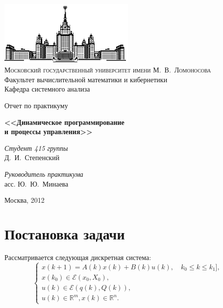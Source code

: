 \documentclass[10pt, a4paper]{article}
\renewcommand{\ell}{\mathcal{E}}
\begin{document}
\thispagestyle{empty}

\begin{center}
\ \vspace{-3cm}

\includegraphics[width=0.5\textwidth]{msu.eps}\\
{\scshape Московский государственный университет имени М.~В.~Ломоносова}\\
Факультет вычислительной математики и кибернетики\\
Кафедра системного анализа

\vfill
{\LARGE Отчет по практикуму}

\vspace{1cm}

{\Huge\bfseries <<Динамическое программирование \\ и процессы управления>>}
\end{center}

\vspace{2cm}

\begin{flushright}
  \large
  \textit{Студент 415 группы}\\
  Д.~И.~Степенский

  \vspace{5mm}

  \textit{Руководитель практикума}\\
  асс. Ю.~Ю.~Минаева
\end{flushright}

\vfill

\begin{center}
Москва, 2012
\end{center}

\newpage

\tableofcontents

\newpage

\section{Постановка задачи}
Рассматривается следующая дискретная система:
\begin{equation}\label{statement_system} \begin{cases}
{x}(k+1) = A(k)x(k)+B(k)u(k),\quad k_0\leqslant k\leqslant k_1],\\
x(k_0)\in \ell(x_0,X_0), \\
u(k) \in \ell(q(k),Q(k)),\\
u(k)\in \mathbb{R}^m, x(k)\in \mathbb{R}^n.
\end{cases} \end{equation}  
\end{document}
